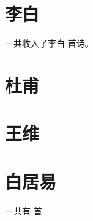 \documentclass[twocolumn]{ctexart}
\newcommand{\二号}{\fontsize{21pt}{\baselineskip}\selectfont}%
\newcommand{\三号}{\fontsize{15.75pt}{\baselineskip}\selectfont}
\newcommand{\四号}{\fontsize{14pt}{\baselineskip}\selectfont}
\newcounter{poetrycounterall} %
\newcounter{poetrycounter}[section] %
\newcounter{poetrycountersub}[subsection] %
\begin{document}
\tableofcontents   

\newpage

\clearpage
\section{李白}





\setcounter{libaiqijuecot}{\thepoetrycountersub}

一共收入了李白 \thepoetrycounter  首诗。

\clearpage


\section{杜甫}





\clearpage




\section{王维}






\clearpage




\section{白居易}





\clearpage






% 
% 
% 

一共有 \thepoetrycounterall 首.
\end{document}
